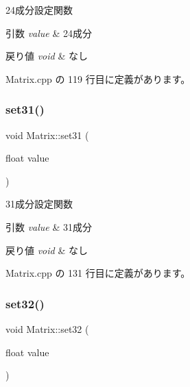 24成分設定関数 


\begin{DoxyParams}{引数}
{\em value} & 24成分 \\
\hline
\end{DoxyParams}

\begin{DoxyRetVals}{戻り値}
{\em void} & なし \\
\hline
\end{DoxyRetVals}


 Matrix.\+cpp の 119 行目に定義があります。

\mbox{\label{class_matrix_a625ed38d8c5e8d20cdd399a5afd61c45}} 
\subsubsection{\texorpdfstring{set31()}{set31()}}
{\footnotesize\ttfamily void Matrix\+::set31 (\begin{DoxyParamCaption}\item[{float}]{value }\end{DoxyParamCaption})}



31成分設定関数 


\begin{DoxyParams}{引数}
{\em value} & 31成分 \\
\hline
\end{DoxyParams}

\begin{DoxyRetVals}{戻り値}
{\em void} & なし \\
\hline
\end{DoxyRetVals}


 Matrix.\+cpp の 131 行目に定義があります。

\mbox{\label{class_matrix_a3cc8c6612366d92b7b8a81f7f802f50c}} 
\subsubsection{\texorpdfstring{set32()}{set32()}}
{\footnotesize\ttfamily void Matrix\+::set32 (\begin{DoxyParamCaption}\item[{float}]{value }\end{DoxyParamCaption})}



